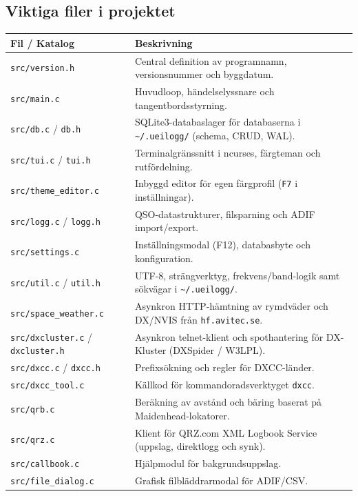 \documentclass[11pt,a4paper]{article}
\begin{document}
\subsection{Viktiga filer i projektet}

\begin{table}[htbp]
\centering
\small
\begin{tabularx}{\textwidth}{lX}
\toprule
\textbf{Fil / Katalog} & \textbf{Beskrivning} \\
\midrule
\texttt{src/version.h} & Central definition av programnamn, versionsnummer och byggdatum. \\
\texttt{src/main.c} & Huvudloop, händelselyssnare och tangentbordsstyrning. \\
\texttt{src/db.c} / \texttt{db.h} & SQLite3-databaslager för databaserna i \texttt{\textasciitilde/.ueilogg/} (schema, CRUD, WAL). \\
\texttt{src/tui.c} / \texttt{tui.h} & Terminalgränssnitt i ncurses, färgteman och rutfördelning. \\
\texttt{src/theme\_editor.c} & Inbyggd editor för egen färgprofil (\texttt{F7} i inställningar). \\
\texttt{src/logg.c} / \texttt{logg.h} & QSO-datastrukturer, filsparning och ADIF import/export. \\
\texttt{src/settings.c} & Inställningsmodal (F12), databasbyte och konfiguration. \\
\texttt{src/util.c} / \texttt{util.h} & UTF-8, strängverktyg, frekvens/band-logik samt sökvägar i \texttt{\textasciitilde/.ueilogg/}. \\
\texttt{src/space\_weather.c} & Asynkron HTTP-hämtning av rymdväder och DX/NVIS från \texttt{hf.avitec.se}. \\
\texttt{src/dxcluster.c} / \texttt{dxcluster.h} & Asynkron telnet-klient och spothantering för DX-Kluster (DXSpider / W3LPL). \\
\texttt{src/dxcc.c} / \texttt{dxcc.h} & Prefixsökning och regler för DXCC-länder. \\
\texttt{src/dxcc\_tool.c} & Källkod för kommandoradsverktyget \texttt{dxcc}. \\
\texttt{src/qrb.c} & Beräkning av avstånd och bäring baserat på Maidenhead-lokatorer. \\
\texttt{src/qrz.c} & Klient för QRZ.com XML Logbook Service (uppslag, direktlogg och synk). \\
\texttt{src/callbook.c} & Hjälpmodul för bakgrundsuppslag. \\
\texttt{src/file\_dialog.c} & Grafisk filbläddrarmodal för ADIF/CSV. \\

\end{tabularx}
\end{table}
\end{document}
